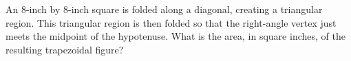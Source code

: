 An $8$-inch by $8$-inch square is folded along a diagonal, creating a triangular region. This triangular region is then folded so that the right-angle vertex just meets the midpoint of the hypotenuse. What is the area, in square inches, of the resulting trapezoidal figure?
